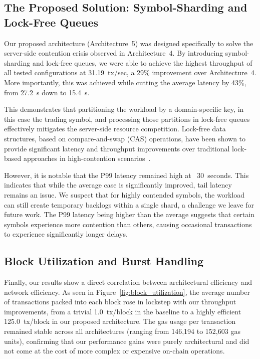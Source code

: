 \subsection{The Proposed Solution: Symbol-Sharding and Lock-Free Queues}

Our proposed architecture (Architecture~5) was designed specifically to solve the server-side contention crisis observed in Architecture~4. By introducing symbol-sharding and lock-free queues, we were able to achieve the highest throughput of all tested configurations at 31.19~tx/sec, a 29\% improvement over Architecture~4. More importantly, this was achieved while cutting the average latency by 43\%, from 27.2~s down to 15.4~s.

This demonstrates that partitioning the workload by a domain-specific key, in this case the trading symbol, and processing those partitions in lock-free queues effectively mitigates the server-side resource competition. Lock-free data structures, based on compare-and-swap (CAS) operations, have been shown to provide significant latency and throughput improvements over traditional lock-based approaches in high-contention scenarios~\cite{harris2001pragmatic}.

However, it is notable that the P99 latency remained high at ~30~seconds. This indicates that while the average case is significantly improved, tail latency remains an issue. We suspect that for highly contended symbols, the workload can still create temporary backlogs within a single shard, a challenge we leave for future work. The P99 latency being higher than the average suggests that certain symbols experience more contention than others, causing occasional transactions to experience significantly longer delays.

\subsection{Block Utilization and Burst Handling}

Finally, our results show a direct correlation between architectural efficiency and network efficiency. As seen in Figure~\ref{fig:block_utilization}, the average number of transactions packed into each block rose in lockstep with our throughput improvements, from a trivial 1.0~tx/block in the baseline to a highly efficient 125.0~tx/block in our proposed architecture. The gas usage per transaction remained stable across all architectures (ranging from 146,194 to 152,603 gas units), confirming that our performance gains were purely architectural and did not come at the cost of more complex or expensive on-chain operations.

